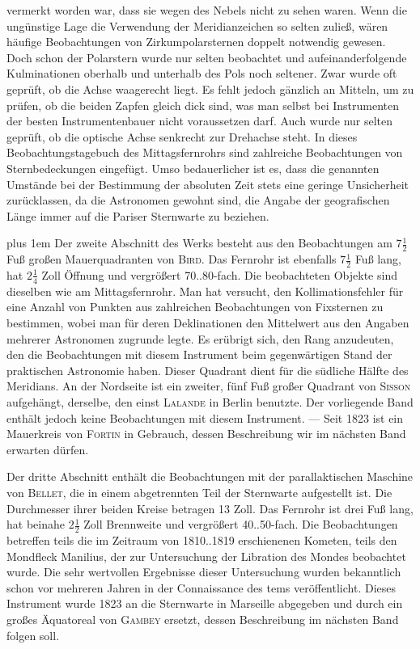 vermerkt worden war, dass sie wegen des Nebels nicht zu sehen waren. Wenn die ungünstige Lage die Verwendung der Meridianzeichen so selten zuließ, wären häufige Beobachtungen von Zirkumpolarsternen doppelt notwendig gewesen. Doch schon der Polarstern wurde nur selten beobachtet und aufeinanderfolgende Kulminationen oberhalb und unterhalb des Pols noch seltener. Zwar wurde oft geprüft, ob die Achse waagerecht liegt. Es fehlt jedoch gänzlich an Mitteln, um zu prüfen, ob die beiden Zapfen gleich dick sind, was man selbst bei Instrumenten der besten Instrumentenbauer nicht voraussetzen darf. Auch wurde nur selten geprüft, ob die optische Achse senkrecht zur Drehachse steht. In dieses Beobachtungstagebuch des Mittagsfernrohrs sind zahlreiche Beobachtungen von Sternbedeckungen eingefügt. Umso bedauerlicher ist es, dass die genannten Umstände bei der Bestimmung der absoluten Zeit stets eine geringe Unsicherheit zurücklassen, da die Astronomen gewohnt sind, die Angabe der geografischen Länge immer auf die Pariser Sternwarte zu beziehen.

\begingroup\rightskip=0pt plus 1em Der zweite Abschnitt des Werks besteht aus den Beobachtungen am $7\frac{1}{2}$ Fuß großen Mauerquadranten von \textsc{Bird}. Das Fernrohr ist ebenfalls $7\frac{1}{2}$ Fuß lang, hat $2\frac{1}{4}$ Zoll Öffnung und vergrößert 70..80-fach. Die beobachteten Objekte sind dieselben wie am Mittagsfernrohr. Man hat versucht, den Kollimationsfehler für eine Anzahl von Punkten aus zahlreichen Beobachtungen von Fixsternen zu bestimmen, wobei man für deren Deklinationen den Mittelwert aus den Angaben mehrerer Astronomen zugrunde legte. Es erübrigt sich, den Rang anzudeuten, den die Beobachtungen mit diesem Instrument beim gegenwärtigen Stand der praktischen Astronomie haben. Dieser Quadrant dient für die südliche Hälfte des Meridians. An der Nordseite ist ein zweiter, fünf Fuß großer Quadrant von \textsc{Sisson} aufgehängt, derselbe, den einst \textsc{Lalande} in Berlin benutzte. Der vorliegende Band enthält jedoch keine Beobachtungen mit diesem Instrument. --- Seit 1823 ist ein Mauerkreis von \textsc{Fortin} in Gebrauch, dessen Beschreibung wir im nächsten Band erwarten dürfen.\par\endgroup

Der dritte Abschnitt enthält die Beobachtungen mit der parallaktischen Maschine von \textsc{Bellet}, die in einem abgetrennten Teil der Sternwarte aufgestellt ist. Die Durchmesser ihrer beiden Kreise betragen 13 Zoll. Das Fernrohr ist drei Fuß lang, hat beinahe $2\frac{1}{2}$ Zoll Brennweite und vergrößert 40..50-fach. Die Beobachtungen betreffen teils die im Zeitraum von 1810..1819 erschienenen Kometen, teils den Mondfleck Manilius, der zur Untersuchung der Libration des Mondes beobachtet wurde. Die sehr wertvollen Ergebnisse dieser Untersuchung wurden bekanntlich schon vor mehreren Jahren in der Connaissance des tems veröffentlicht. Dieses Instrument wurde 1823 an die Sternwarte in Marseille abgegeben und durch ein großes Äquatoreal von \textsc{Gambey} ersetzt, dessen Beschreibung im nächsten Band folgen soll.
